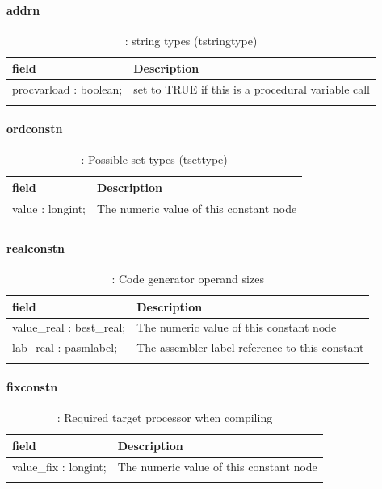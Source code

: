 \documentclass [12pt]{article}
\begin{document}
\paragraph{addrn}\mbox{}

\begin{longtable}{|l|p{10cm}|}
\hline
field	& Description \\
\hline
\endhead
\hline
\endfoot
\textsf{procvarload : boolean;}& 
set to TRUE if this is a procedural variable call \\
\hline
\caption{: string types (tstringtype)}
\end{longtable}

\paragraph{ordconstn}\mbox{}

\begin{longtable}{|l|p{10cm}|}
\hline
field	& Description \\
\hline
\endhead
\hline
\endfoot
\textsf{value : longint;}& 
The numeric value of this constant node \\
\hline
\caption{: Possible set types (tsettype)}
\end{longtable}

\paragraph{realconstn}\mbox{}

\begin{longtable}{|l|p{10cm}|}
\hline
field	& Description \\
\hline
\endhead
\hline
\endfoot
\textsf{value{\_}real : best{\_}real;}& 
The numeric value of this constant node \\
\textsf{lab{\_}real : pasmlabel;}& 
The assembler label reference to this constant \\
\hline
\caption{: Code generator operand sizes}\label{tab16}
\end{longtable}

\paragraph{fixconstn}\mbox{}

\begin{longtable}{|l|p{10cm}|}
\hline
field	& Description \\
\hline
\endhead
\hline
\endfoot
\textsf{value{\_}fix : longint;}& 
The numeric value of this constant node \\
\hline
\caption{: Required target processor when compiling}
\label{tab17}
\end{longtable}
\end{document}
